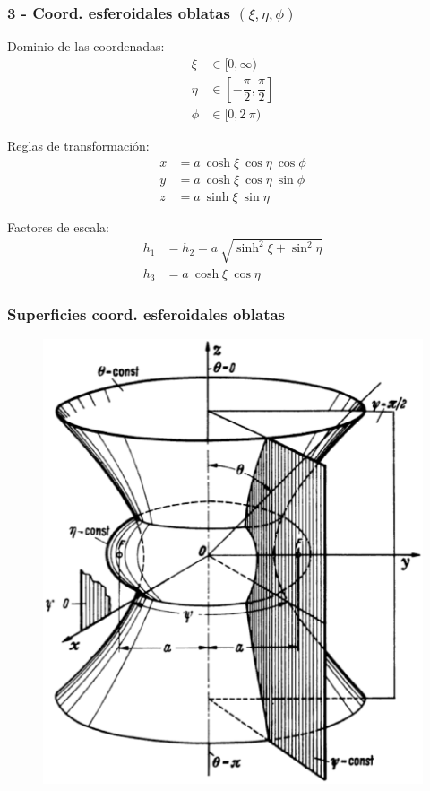 \documentclass[12pt]{beamer}
\begin{document}
\begin{frame}
\frametitle{3 - Coord. esferoidales oblatas $(\xi, \eta, \phi)$}
\fontsize{12}{12}\selectfont
\begin{minipage}{0.45\textwidth}
Dominio de las coordenadas:
\pause
\begin{align*}
\xi &\in [0, \infty) \\
\eta &\in \left[- \dfrac{\pi}{2}, \dfrac{\pi}{2} \right] \\
\phi &\in [0, 2\: \pi)
\end{align*}
\end{minipage}
\hspace{1cm}
\pause
\begin{minipage}{0.4\textwidth}
Reglas de transformación:
\pause
\begin{align*}
x &= a \: \cosh \xi \: \cos \eta \: \cos \phi \\
y &= a \: \cosh \xi \: \cos \eta \: \sin \phi\\
z &= a \: \sinh \xi \: \sin \eta
\end{align*}
\end{minipage}

\pause
Factores de escala:
\pause
\begin{align*}
h_{1 }&= h_{2} = a \: \sqrt{\sinh^{2} \xi + \sin^{2} \eta} \\
h_{3 }&= a \: \cosh \xi \: \cos \eta
\end{align*}
\end{frame}
\begin{frame}
\frametitle{Superficies coord. esferoidales oblatas}
\begin{figure}[H]
  \centering
  \includegraphics[scale=0.3]{Imagenes/Sistema_Esfeoridal_Oblato.eps}
\end{figure}
\end{frame}  
\end{document}
